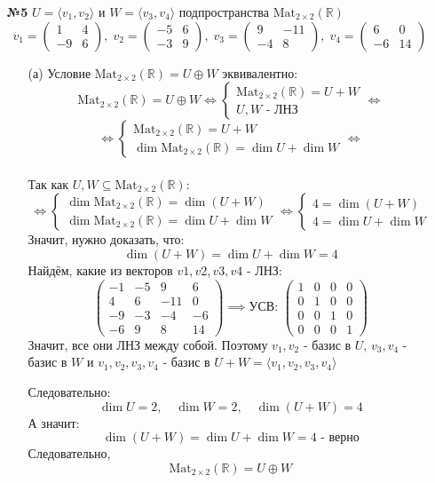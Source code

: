 \documentclass[a4paper]{article}
\newcommand{\mat}[1]{\begin{pmatrix} #1 \end{pmatrix}}
\newcommand{\case}[1]{\begin{cases} #1 \end{cases}}
\newcommand{\lr}{\Leftrightarrow}
\newcommand{\RR}{\mathbb{R}}
\begin{document}
\begin{enumerate}
    \item[\textbf{№5}]$U = \langle v_1, v_2\rangle$ и $W = \langle v_3, v_4\rangle$ подпространства $\text{Mat}_{2\times 2}(\RR)$
    $$
    v_1 = \mat{1 & 4\\ -9 & 6}, \;v_2 = \mat{-5 & 6 \\ -3 & 9}, \; v_3 = \mat{9 & -11 \\ -4 & 8},\; v_4 = \mat{6 & 0 \\ -6 & 14}
    $$
    \begin{enumerate}
        \item[(а)] Условие $\text{Mat}_{2\times 2}(\RR) = U \oplus W$ эквивалентно:
        $$
        \text{Mat}_{2\times 2}(\RR)= U \oplus W \lr \case{
            \text{Mat}_{2\times 2}(\RR) = U + W \\
            U, W \text{ - ЛНЗ}
        }\lr $$
        $$\lr \case{
            \text{Mat}_{2\times 2}(\RR) = U + W \\
            \dim \text{Mat}_{2\times 2}(\RR) = \dim U + \dim W
        }\lr
        $$\\
        Так как $U, W \subseteq \text{Mat}_{2\times 2}(\RR)$:
        $$
        \lr \case{
            \dim \text{Mat}_{2\times 2}(\RR) = \dim(U + W) \\
            \dim \text{Mat}_{2\times 2}(\RR) = \dim U + \dim W
        }\lr \case{
            4 = \dim(U + W) \\
            4 = \dim U + \dim W
        }
        $$
        Значит, нужно доказать, что:
        $$\dim(U + W) = \dim U + \dim W = 4$$
        Найдём, какие из векторов $v1, v2, v3, v4$ - ЛНЗ:
        $$
        \mat{-1 & -5& 9 & 6 \\
        4 & 6 & -11 &0 \\
        -9 & -3 & -4 & -6\\
        -6 & 9 & 8 & 14}
        \implies \text{УСВ: } \begin{pmatrix}
            1 & 0 & 0 & 0 \\
            0 & 1 & 0 & 0 \\
            0 & 0 & 1 & 0 \\
            0 & 0 & 0 & 1
            \end{pmatrix}$$
        Значит, все они ЛНЗ между собой. Поэтому $v_1, v_2$ - базис в $U$, $v_3, v_4$ - базис в $W$ и $v_1, v_2, v_3, v_4$ - базис в $U + W = \langle v_1, v_2, v_3, v_4 \rangle$

        Следовательно:
        $$\dim U = 2, \quad \dim W = 2, \quad \dim (U+W) = 4$$
        А значит:
        $$\dim(U + W) = \dim U + \dim W = 4 \text{ - верно}$$
        Следовательно,
        $$\text{Mat}_{2\times 2}(\RR) = U \oplus W$$


\end{enumerate}
\end{enumerate}
\end{document}
